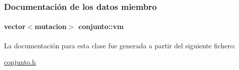 \subsubsection{Documentación de los datos miembro}
\paragraph[{\texorpdfstring{vm}{vm}}]{\setlength{\rightskip}{0pt plus 5cm}vector$<$mutacion$>$ conjunto\+::vm\hspace{0.3cm}{\ttfamily [private]}}\hypertarget{classconjunto_ac85e51076195e0c74574c72d2dffa728}{}\label{classconjunto_ac85e51076195e0c74574c72d2dffa728}


La documentación para esta clase fue generada a partir del siguiente fichero\+:\begin{DoxyCompactItemize}
\item 
\hyperlink{conjunto_8h}{conjunto.\+h}\end{DoxyCompactItemize}
